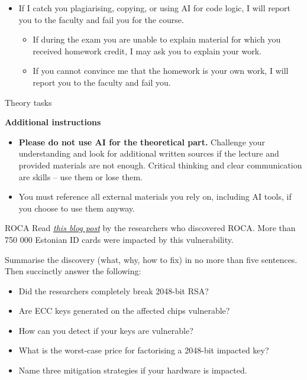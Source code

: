 \documentclass{homework}
\begin{document}
\begin{itemize}
\begin{itemize}
    \item Not acceptable: e.g. generating code logic, library use, or crypto operations.
    \item If you use AI in any form, including for rewording, state in your report where and what you used it for.
    \item I recommend asking in the server or contacting me instead of using AI.
  \end{itemize}
  \item If I catch you plagiarising, copying, or using AI for code logic, I will report you to the faculty and fail you for the course.
  \begin{itemize}
    \item If during the exam you are unable to explain material for which you received homework credit, I may ask you to explain your work.
    \item If you cannot convince me that the homework is your own work, I will report you to the faculty and fail you.
  \end{itemize}
\end{itemize}

\newpage

\begin{center}
  Theory tasks
\end{center}

\textbf{Additional instructions}

\begin{itemize}
  \item \textbf{Please do not use AI for the theoretical part.}
  Challenge your understanding and look for additional written sources if the lecture and provided materials are not enough.
  Critical thinking and clear communication are skills -- use them or lose them.
  \item You must reference all external materials you rely on, including AI tools, if you choose to use them anyway.
\end{itemize}

\begin{task}{ROCA}
  Read \href{https://crocs.fi.muni.cz/public/papers/rsa_ccs17}{\emph{this blog post}} by the researchers who discovered ROCA.
  More than 750 000 Estonian ID cards were impacted by this vulnerability.

  Summarise the discovery (what, why, how to fix) in no more than five sentences.
  Then succinctly answer the following:
  \begin{itemize}
    \item Did the researchers completely break 2048-bit RSA?
    \item Are ECC keys generated on the affected chips vulnerable?
    \item How can you detect if your keys are vulnerable?
    \item What is the worst-case price for factorising a 2048-bit impacted key?
    \item Name three mitigation strategies if your hardware is impacted.
  \end{itemize}
\end{task}
\end{document}
